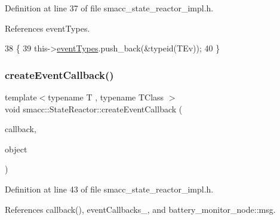 Definition at line 37 of file smacc\+\_\+state\+\_\+reactor\+\_\+impl.\+h.



References event\+Types.


\begin{DoxyCode}
38 \{
39     this->\hyperlink{classsmacc_1_1StateReactor_a65c8ddfce40e7859e5c73fff1cf6c04b}{eventTypes}.push\_back(&\textcolor{keyword}{typeid}(TEv));
40 \}
\end{DoxyCode}
\mbox{\label{classsmacc_1_1StateReactor_a68482e08f6449694a0bcda843b14b376}} 
\subsubsection{\texorpdfstring{create\+Event\+Callback()}{createEventCallback()}\hspace{0.1cm}{\footnotesize\ttfamily [1/2]}}
{\footnotesize\ttfamily template$<$typename T , typename T\+Class $>$ \\
void smacc\+::\+State\+Reactor\+::create\+Event\+Callback (\begin{DoxyParamCaption}\item[{void(T\+Class\+::$\ast$)(T $\ast$)}]{callback,  }\item[{T\+Class $\ast$}]{object }\end{DoxyParamCaption})}



Definition at line 43 of file smacc\+\_\+state\+\_\+reactor\+\_\+impl.\+h.



References callback(), event\+Callbacks\+\_\+, and battery\+\_\+monitor\+\_\+node\+::msg.


